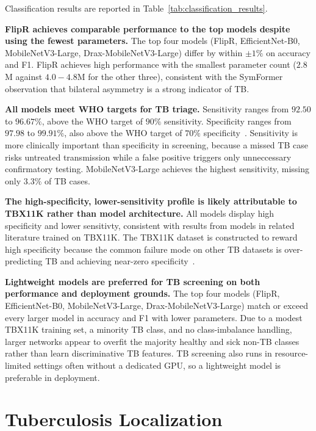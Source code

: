 \documentclass[conference, letterpaper]{IEEEtran}
\begin{document}
Classification results are reported in Table~\ref{tab:classification_results}.

\textbf{FlipR achieves comparable performance to the top models despite using the fewest parameters.} The top four models (FlipR, EfficientNet-B0, MobileNetV3-Large, Drax-MobileNetV3-Large) differ by within $\pm 1\%$ on accuracy and F1. FlipR achieves high performance with the smallest parameter count ($2.8$M against $4.0-4.8$M for the other three), consistent with the SymFormer~\cite{liu2023tbx11k_pami} observation that bilateral asymmetry is a strong indicator of TB.

\textbf{All models meet WHO targets for TB triage.}
Sensitivity ranges from $92.50$ to $96.67\%$, above the WHO target of $90\%$ sensitivity. Specificity ranges from $97.98$ to $99.91\%$, also above the WHO target of $70\%$ specificity~\cite{who_screening_2021}. Sensitivity is more clinically important than specificity in screening, because a missed TB case risks untreated transmission while a false positive triggers only unneccessary confirmatory testing. MobileNetV3-Large achieves the highest sensitivity, missing only $3.3\%$ of TB cases.

\textbf{The high-specificity, lower-sensitivity profile is likely attributable to TBX11K rather than model architecture.}
All models display high specificity and lower sensitivty, consistent with results from models in related literature trained on TBX11K. The TBX11K dataset is constructed to reward high specificity because the common failure mode on other TB datasets is over-predicting TB and achieving near-zero specificity~\cite{liu2023tbx11k_pami}.

\textbf{Lightweight models are preferred for TB screening on both performance and deployment grounds.}
The top four models (FlipR, EfficientNet-B0, MobileNetV3-Large, Drax-MobileNetV3-Large) match or exceed every larger model in accuracy and F1 with lower parameters. Due to a modest TBX11K training set, a minority TB class, and no class-imbalance handling, larger networks appear to overfit the majority healthy and sick non-TB classes rather than learn discriminative TB features. TB screening also runs in resource-limited settings often without a dedicated GPU, so a lightweight model is preferable in deployment.

\section{Tuberculosis Localization}
\label{sec:tb_localization}
\end{document}
